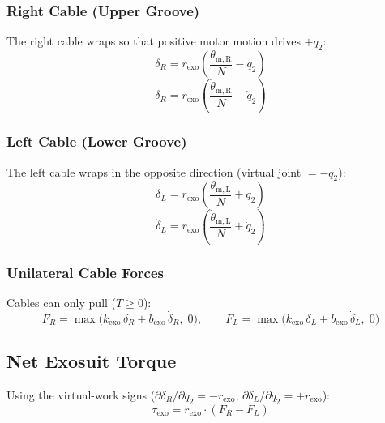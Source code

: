 \documentclass[11pt,a4paper]{article}
\begin{document}
\subsubsection{Right Cable (Upper Groove)}
The right cable wraps so that positive motor motion drives $+q_2$:
\begin{equation}
\boxed{\delta_R = r_{\mathrm{exo}} \!\left(\frac{\theta_{\mathrm{m,R}}}{N} - q_2\right)}
\label{eq:delta_R}
\end{equation}
\begin{equation}
    \dot{\delta}_R = r_{\mathrm{exo}} \!\left(\frac{\dot{\theta}_{\mathrm{m,R}}}{N} - \dot{q}_2\right)
\label{eq:delta_R_dot}
\end{equation}

\subsubsection{Left Cable (Lower Groove)}
The left cable wraps in the opposite direction (virtual joint $= -q_2$):
\begin{equation}
\boxed{\delta_L = r_{\mathrm{exo}} \!\left(\frac{\theta_{\mathrm{m,L}}}{N} + q_2\right)}
\label{eq:delta_L}
\end{equation}
\begin{equation}
    \dot{\delta}_L = r_{\mathrm{exo}} \!\left(\frac{\dot{\theta}_{\mathrm{m,L}}}{N} + \dot{q}_2\right)
\label{eq:delta_L_dot}
\end{equation}

\subsubsection{Unilateral Cable Forces}
Cables can only pull ($T \geq 0$):
\begin{equation}
\boxed{
    F_R = \max\!\bigl(k_{\mathrm{exo}}\,\delta_R + b_{\mathrm{exo}}\,\dot{\delta}_R,\;0\bigr), \qquad
    F_L = \max\!\bigl(k_{\mathrm{exo}}\,\delta_L + b_{\mathrm{exo}}\,\dot{\delta}_L,\;0\bigr)
}
\label{eq:exo_forces}
\end{equation}


\subsection{Net Exosuit Torque}

Using the virtual-work signs ($\partial\delta_R / \partial q_2 = -r_{\mathrm{exo}}$, $\partial\delta_L / \partial q_2 = +r_{\mathrm{exo}}$):
\begin{equation}
\boxed{\tau_{\mathrm{exo}} = r_{\mathrm{exo}} \cdot (F_R - F_L)}
\label{eq:tau_exo}
\end{equation}
\end{document}
